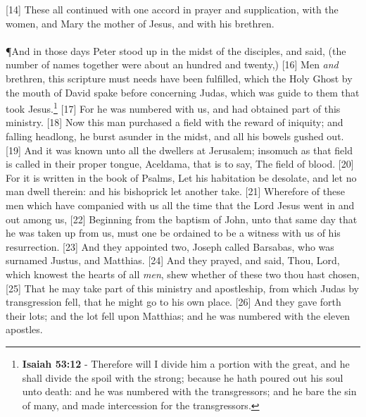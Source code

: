 [14] \textcolor[cmyk]{0.99998,1,0,0}{These all continued with one accord in prayer and supplication, with the women, and Mary the mother of Jesus, and with his brethren.}\\
\\
\P \textcolor[cmyk]{0.99998,1,0,0}{And in those days Peter stood up in the midst of the disciples, and said, (the number of names together were about an hundred and twenty,)}
[16] \textcolor[cmyk]{0.99998,1,0,0}{Men \emph{and} brethren, this scripture must needs have been fulfilled, which the Holy Ghost by the mouth of David spake before concerning Judas, which was guide to them that took Jesus.}\footnote{\textbf{Isaiah 53:12} - Therefore will I divide him a portion with the great, and he shall divide the spoil with the strong; because he hath poured out his soul unto death: and he was numbered with the transgressors; and he bare the sin of many, and made intercession for the transgressors.}
[17] \textcolor[cmyk]{0.99998,1,0,0}{For he was numbered with us, and had obtained part of this ministry.}
[18] \textcolor[cmyk]{0.99998,1,0,0}{Now this man purchased a field with the reward of iniquity; and falling headlong, he burst asunder in the midst, and all his bowels gushed out.}
[19] \textcolor[cmyk]{0.99998,1,0,0}{And it was known unto all the dwellers at Jerusalem; insomuch as that field is called in their proper tongue, Aceldama, that is to say, The field of blood.}
[20] \textcolor[cmyk]{0.99998,1,0,0}{For it is written in the book of Psalms, Let his habitation be desolate, and let no man dwell therein: and his bishoprick let another take.}
[21] \textcolor[cmyk]{0.99998,1,0,0}{Wherefore of these men which have companied with us all the time that the Lord Jesus went in and out among us,}
[22] \textcolor[cmyk]{0.99998,1,0,0}{Beginning from the baptism of John, unto that same day that he was taken up from us, must one be ordained to be a witness with us of his resurrection.}
[23] \textcolor[cmyk]{0.99998,1,0,0}{And they appointed two, Joseph called Barsabas, who was surnamed Justus, and Matthias.}
[24] \textcolor[cmyk]{0.99998,1,0,0}{And they prayed, and said, Thou, Lord, which knowest the hearts of all \emph{men}, shew whether of these two thou hast chosen,}
[25] \textcolor[cmyk]{0.99998,1,0,0}{That he may take part of this ministry and apostleship, from which Judas by transgression fell, that he might go to his own place.}
[26] \textcolor[cmyk]{0.99998,1,0,0}{And they gave forth their lots; and the lot fell upon Matthias; and he was numbered with the eleven apostles.}


